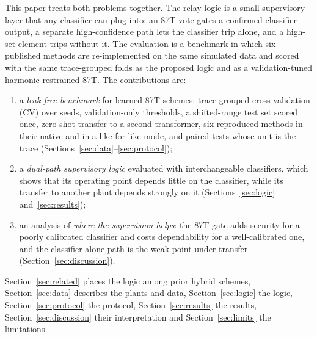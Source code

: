 \documentclass[preprint,12pt]{elsarticle}
\begin{document}
This paper treats both problems together. The relay logic is a small supervisory layer that any classifier can plug into: an 87T vote gates a confirmed classifier output, a separate high-confidence path lets the classifier trip alone, and a high-set element trips without it. The evaluation is a benchmark in which six published methods are re-implemented on the same simulated data and scored with the same trace-grouped folds as the proposed logic and as a validation-tuned harmonic-restrained 87T. The contributions are:
\begin{enumerate}
\item a \emph{leak-free benchmark} for learned 87T schemes: trace-grouped cross-validation (CV) over \nSeeds{} seeds, validation-only thresholds, a shifted-range test set scored once, zero-shot transfer to a second transformer, six reproduced methods in their native and in a like-for-like mode, and paired tests whose unit is the trace (Sections~\ref{sec:data}--\ref{sec:protocol});
\item a \emph{dual-path supervisory logic} evaluated with \nClsAll{} interchangeable classifiers, which shows that its operating point depends little on the classifier, while its transfer to another plant depends strongly on it (Sections~\ref{sec:logic} and~\ref{sec:results});
\item an analysis of \emph{where the supervision helps}: the 87T gate adds security for a poorly calibrated classifier and costs dependability for a well-calibrated one, and the classifier-alone path is the weak point under transfer (Section~\ref{sec:discussion}).
\end{enumerate}
Section~\ref{sec:related} places the logic among prior hybrid schemes, Section~\ref{sec:data} describes the plants and data, Section~\ref{sec:logic} the logic, Section~\ref{sec:protocol} the protocol, Section~\ref{sec:results} the results, Section~\ref{sec:discussion} their interpretation and Section~\ref{sec:limits} the limitations.

\end{document}
